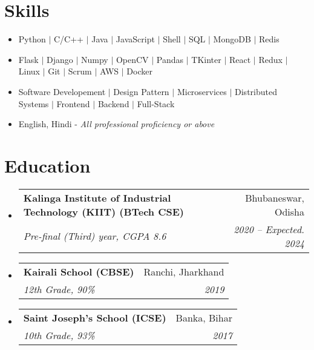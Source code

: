 \documentclass[letterpaper,11pt]{article}
\makeatletter
\newcommand{\resumeItem}[1]{
  \item\small{
    {#1 \vspace{-2pt}}
  }
}
\newcommand{\resumeSubheading}[4]{
  \vspace{-2pt}\item
    \begin{tabular*}{0.97\textwidth}[t]{l@{\extracolsep{\fill}}r}
      \textbf{#1} & #2 \\
      \textit{\small#3} & \textit{\small #4} \\
    \end{tabular*}\vspace{-7pt}
}
\newcommand{\resumeSubHeadingListStart}{\begin{itemize}[leftmargin=0.15in, label={}]}
\newcommand{\resumeSubHeadingListEnd}{\end{itemize}}
\newcommand{\resumeItemListStart}{\begin{itemize}}
\newcommand{\resumeItemListEnd}{\end{itemize}\vspace{-5pt}}
\makeatother
\begin{document}
%

\section{Skills}
    \begin{itemize}[leftmargin=0.15in, label={}]
        \small{\item{
            \resumeItemListStart
                \resumeItem{ Python $|$ C/C++ $|$ Java $|$ JavaScript $|$ Shell $|$ SQL $|$ MongoDB $|$ Redis}
                \resumeItem{ Flask $|$ Django $|$ Numpy $|$ OpenCV $|$ Pandas $|$ TKinter $|$ React $|$ Redux $|$ Linux $|$ Git $|$ Scrum $|$ AWS $|$ Docker}
                \resumeItem{ Software Developement $|$ Design Pattern $|$ Microservices $|$ Distributed Systems $|$ Frontend $|$ Backend $|$ Full-Stack}
                \resumeItem{ English, Hindi - \textit{All professional proficiency or above}}
            \resumeItemListEnd
        }}
    \end{itemize}
 
\section{Education}
  \resumeSubHeadingListStart
    \resumeSubheading
      {Kalinga Institute of Industrial Technology (KIIT) (BTech CSE)} {Bhubaneswar, Odisha}
      {Pre-final (Third) year, CGPA 8.6}{2020 -- Expected. 2024}

    \resumeSubheading
      {Kairali School (CBSE)}{Ranchi, Jharkhand}
      {12th Grade, 90\%}{2019}

    \resumeSubheading
      {Saint Joseph's School (ICSE)}{Banka, Bihar}
      {10th Grade, 93\%}{2017}
  \resumeSubHeadingListEnd
\end{document}
